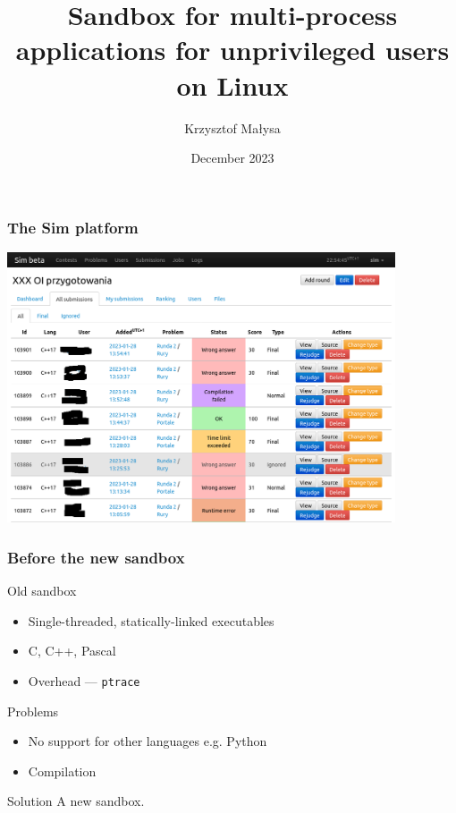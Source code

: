 \documentclass{beamer}
\title[Sandbox for multi-process applications]{Sandbox for multi-process applications for unprivileged users on Linux}
\author{Krzysztof Małysa}
\institute{University of Warsaw}
\date{December 2023}
\begin{document}
\frame{\titlepage}

\begin{frame}
    \frametitle{The Sim platform}
    \includegraphics[height=8cm]{sim.png}
\end{frame}

\begin{frame}
    \frametitle{Before the new sandbox}

    \begin{block}{Old sandbox}
    \begin{itemize}
        \item Single-threaded, statically-linked executables
        \item C, C++, Pascal
        \item Overhead --- \texttt{ptrace}
    \end{itemize}
    \end{block}

    \begin{alertblock}{Problems}
    \begin{itemize}
        \item No support for other languages e.g. Python
        \item Compilation
    \end{itemize}
    \end{alertblock}

    \begin{exampleblock}{Solution}
    A new sandbox.
    \end{exampleblock}
\end{frame}
\end{document}
